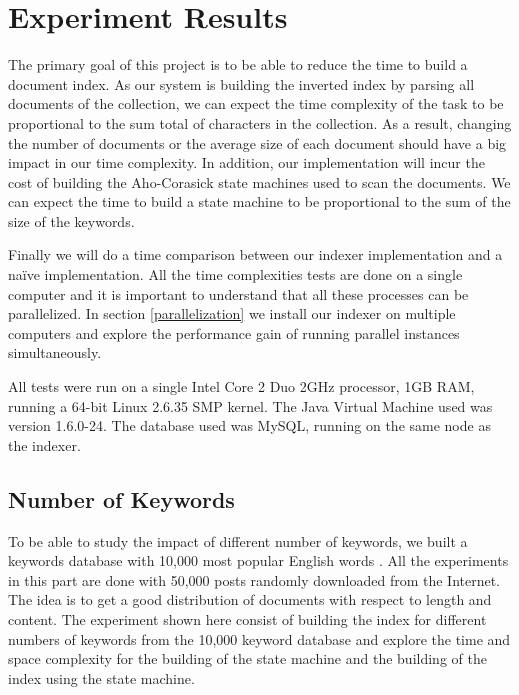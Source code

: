 \documentclass[10pt]{article}
\begin{document}
\section{Experiment Results}
\label{sec:experimentresults}
The primary goal of this project is to be able to reduce the time
to build a document index. As our system is building the inverted index by
parsing all documents of the collection, we can expect the
time complexity of the task to be proportional to the sum total of
characters in the collection. As a result, changing the  
number of documents or the average size of each document should
have a big impact in our time complexity. In addition, our
implementation will incur the cost of building the Aho-Corasick state
machines used to scan the documents. We can expect the time to build a
state machine to be proportional to the sum of the size of the
keywords. 

Finally we will do a time comparison between our indexer
implementation and a na\"{i}ve implementation. All the time
complexities tests are done on a single computer and it is important
to understand that all these processes can be parallelized. In section
\ref{parallelization} we install our indexer on multiple computers and
explore the performance gain of running parallel instances
simultaneously.


All tests were run on a single Intel Core 2 Duo 2GHz processor, 1GB
RAM, running a 64-bit Linux 2.6.35 SMP kernel. The Java Virtual
Machine used was version 1.6.0-24. The database used was MySQL,
running on the same node as the indexer.


\subsection{Number of Keywords}
To be able to study the impact of different number of keywords, we
built a keywords database with 10,000 most popular English
words \cite{wordlist}. All the experiments in this
part are done with 50,000 posts randomly downloaded from the Internet. The
idea is to get a good distribution of documents with respect to length
and content. The experiment shown here consist of building the index
for different numbers of keywords from the 10,000 keyword database and
explore the time and space complexity for the building of the state
machine and the building of the index using the state machine.
\end{document}
